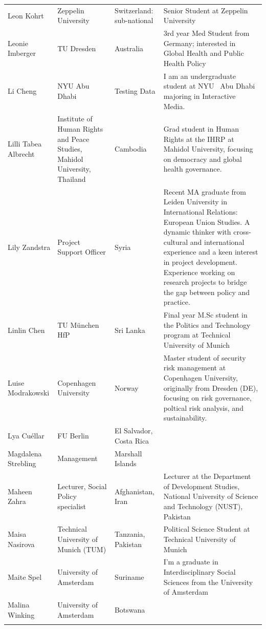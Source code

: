 \documentclass[]{article}
\begin{document}
\begin{longtable}{l>{\raggedright\arraybackslash}p{2cm}>{\raggedright\arraybackslash}p{2cm}>{\raggedright\arraybackslash}p{3cm}}
Leon Kohrt & Zeppelin University & Switzerland: sub-national & Senior Student at Zeppelin University\\
\rowcolor{gray!6}  Leonie Imberger & TU Dresden & Australia & 3rd year Med Student from Germany; interested in Global Health and Public Health Policy\\
Li Cheng & NYU Abu Dhabi & Testing Data & I am an undergraduate student at NYU  Abu Dhabi majoring in Interactive Media.\\
\addlinespace
\rowcolor{gray!6}  Lilli Tabea Albrecht & Institute of Human Rights and Peace Studies, Mahidol University, Thailand & Cambodia & Grad student in Human Rights at the IHRP at Mahidol University, focusing on democracy and global health governance.\\
Lily Zandstra & Project Support Officer & Syria & Recent MA graduate from Leiden University in International Relations: European Union Studies. A dynamic thinker with cross-cultural and international experience and a keen interest in project development. Experience working on research projects to bridge the gap between policy and practice.\\
\rowcolor{gray!6}  Linlin Chen & TU München HfP & Sri Lanka & Final year M.Sc student in the Politics and Technology program at Technical University of Munich\\
Luise Modrakowski & Copenhagen University & Norway & Master student of security risk management at Copenhagen University, originally from Dresden (DE), focusing on risk governance, poltical risk analysis, and sustainability.\\
\rowcolor{gray!6}  Lya Cuéllar & FU Berlin & El Salvador, Costa Rica & \\
\addlinespace
Magdalena Strebling & Management & Marshall Islands & \\
\rowcolor{gray!6}  Maheen Zahra & Lecturer, Social Policy specialist & Afghanistan, Iran & Lecturer at the Department of Development Studies, National University of Science and Technology (NUST), Pakistan\\
Maisa Nasirova & Technical University of Munich (TUM) & Tanzania, Pakistan & Political Science Student at Technical University of Munich\\
\rowcolor{gray!6}  Maite Spel & University of Amsterdam & Suriname & I'm a graduate in Interdisciplinary Social Sciences from the University of Amsterdam\\
Malina Winking & University of Amsterdam & Botswana & \\
\addlinespace

\end{longtable}
\end{document}
